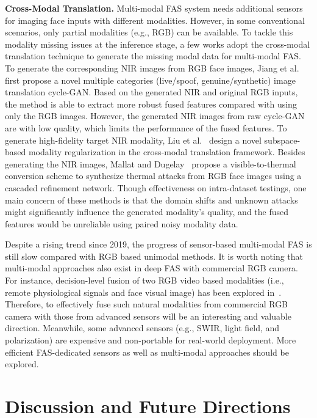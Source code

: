 \documentclass[10pt,journal,compsoc]{IEEEtran}
\begin{document}
\noindent\textbf{Cross-Modal Translation.}\quad
Multi-modal FAS system needs additional sensors for imaging face inputs with different modalities. However, in some conventional scenarios, only partial modalities (e.g., RGB) can be available. To tackle this modality missing issues at the inference stage, a few works adopt the cross-modal translation technique to generate the missing modal data for multi-modal FAS. To generate the corresponding NIR images from RGB face images, Jiang et al.~\cite{jiang2020face} first propose a novel multiple categories (live/spoof, genuine/synthetic) image translation cycle-GAN. Based on the generated NIR and original RGB inputs, the method is able to extract more robust fused features compared with using only the RGB images. However, the generated NIR images from raw cycle-GAN are with low quality, which limits the performance of the fused features. To generate high-fidelity target NIR modality, Liu et al.~\cite{liu2021face} design a novel subspace-based modality regularization in the cross-modal translation framework. Besides generating the NIR images, Mallat and Dugelay~\cite{mallatindirect2021} propose a visible-to-thermal conversion scheme to synthesize thermal attacks from RGB face images using a cascaded refinement network. Though effectiveness on intra-dataset testings, one main concern of these methods is that the domain shifts and unknown attacks might significantly influence the generated modality's quality, and the fused features would be unreliable using paired noisy modality data.


Despite a rising trend since 2019, the progress of sensor-based multi-modal FAS is still slow compared with RGB based unimodal methods. It is worth noting that multi-modal approaches also exist in deep FAS with commercial RGB camera. For instance, decision-level fusion of two RGB video based modalities (i.e., remote physiological signals and face visual image) has been explored in~\cite{lin2019face}. Therefore, to effectively fuse such natural modalities from commercial RGB camera with those from advanced sensors will be an interesting and valuable direction. Meanwhile, some advanced sensors (e.g., SWIR, light field, and polarization) are expensive and non-portable for real-world deployment. More efficient FAS-dedicated sensors as well as multi-modal approaches should be explored.  




\vspace{-0.3em}

\section{Discussion and Future Directions} \label{sec:discussion}
\end{document}
